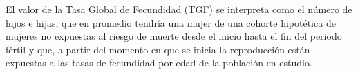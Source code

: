 El valor de la Tasa Global de Fecundidad (TGF) se interpreta como el número de hijos e hijas, que en promedio tendría una mujer de una cohorte hipotética de mujeres no expuestas al riesgo de muerte desde el inicio hasta el fin del periodo fértil y que, a partir del momento en que se inicia la reproducción están expuestas a las tasas de fecundidad por edad de la población en estudio.